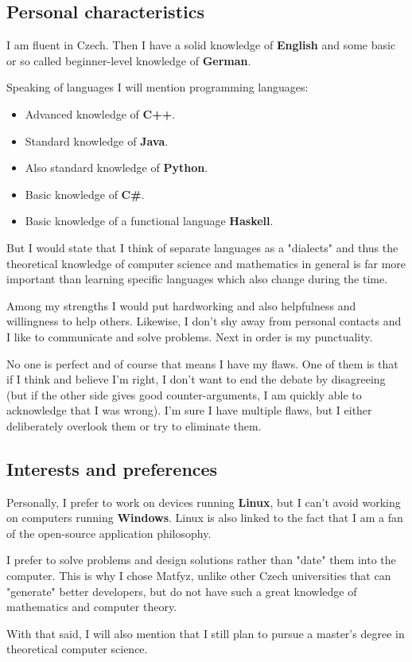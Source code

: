 \documentclass{article}
\begin{document}
\subsection*{Personal characteristics}

I am fluent in Czech. Then I have a solid knowledge of \textbf{English} and some basic or so called beginner-level knowledge of \textbf{German}.

Speaking of languages I will mention programming languages:

\begin{itemize}
	\item Advanced knowledge of \textbf{C++}.
	\item Standard knowledge of \textbf{Java}.
	\item Also standard knowledge of \textbf{Python}.
	\item Basic knowledge of \textbf{C\#}.
	\item Basic knowledge of a functional language \textbf{Haskell}.
\end{itemize}

But I would state that I think of separate languages as a "dialects" and thus the theoretical knowledge of computer science and mathematics in general is far more important than learning specific languages which also change during the time.

Among my strengths I would put hardworking and also helpfulness and willingness to help others. Likewise, I don't shy away from personal contacts and I like to communicate and solve problems. Next in order is my punctuality.

No one is perfect and of course that means I have my flaws. One of them is that if I think and believe I'm right, I don't want to end the debate by disagreeing (but if the other side gives good counter-arguments, I am quickly able to acknowledge that I was wrong). I'm sure I have multiple flaws, but I either deliberately overlook them or try to eliminate them.

\subsection*{Interests and preferences}

Personally, I prefer to work on devices running \textbf{Linux}, but I can't avoid working on computers running \textbf{Windows}. Linux is also linked to the fact that I am a fan of the open-source application philosophy.

I prefer to solve problems and design solutions rather than "date" them into the computer. This is why I chose Matfyz, unlike other Czech universities that can "generate" better developers, but do not have such a great knowledge of mathematics and computer theory.

With that said, I will also mention that I still plan to pursue a master's degree in theoretical computer science.
\end{document}

